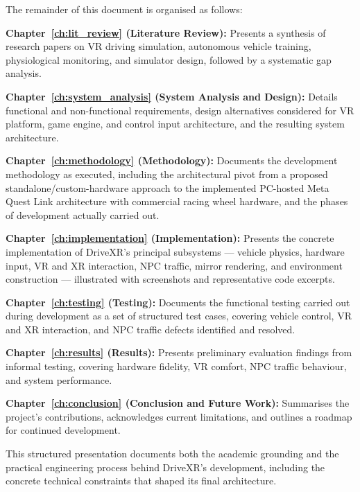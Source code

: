 The remainder of this document is organised as follows:

\textbf{Chapter~\ref{ch:lit_review} (Literature Review):} Presents a synthesis of research papers on VR driving simulation, autonomous vehicle training, physiological monitoring, and simulator design, followed by a systematic gap analysis.

\textbf{Chapter~\ref{ch:system_analysis} (System Analysis and Design):} Details functional and non-functional requirements, design alternatives considered for VR platform, game engine, and control input architecture, and the resulting system architecture.

\textbf{Chapter~\ref{ch:methodology} (Methodology):} Documents the development methodology as executed, including the architectural pivot from a proposed standalone/custom-hardware approach to the implemented PC-hosted Meta Quest Link architecture with commercial racing wheel hardware, and the phases of development actually carried out.

\textbf{Chapter~\ref{ch:implementation} (Implementation):} Presents the concrete implementation of DriveXR's principal subsystems — vehicle physics, hardware input, VR and XR interaction, NPC traffic, mirror rendering, and environment construction — illustrated with screenshots and representative code excerpts.

\textbf{Chapter~\ref{ch:testing} (Testing):} Documents the functional testing carried out during development as a set of structured test cases, covering vehicle control, VR and XR interaction, and NPC traffic defects identified and resolved.

\textbf{Chapter~\ref{ch:results} (Results):} Presents preliminary evaluation findings from informal testing, covering hardware fidelity, VR comfort, NPC traffic behaviour, and system performance.

\textbf{Chapter~\ref{ch:conclusion} (Conclusion and Future Work):} Summarises the project's contributions, acknowledges current limitations, and outlines a roadmap for continued development.

This structured presentation documents both the academic grounding and the practical engineering process behind DriveXR's development, including the concrete technical constraints that shaped its final architecture.